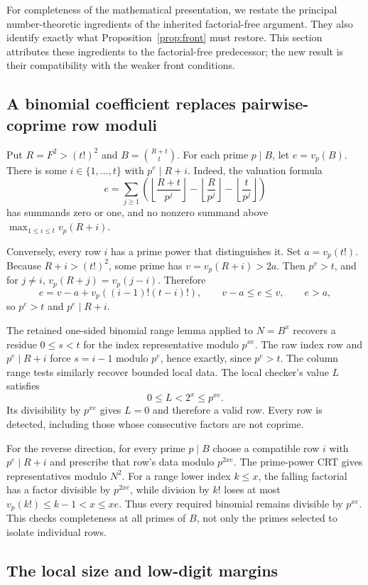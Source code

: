\documentclass[11pt]{article}
\theoremstyle{remark}\newtheorem{remark}[theorem]{Remark}
\begin{document}
For completeness of the mathematical presentation, we restate the
principal number-theoretic ingredients of the inherited factorial-free
argument. They also identify exactly what Proposition~\ref{prop:front}
must restore. This section attributes these ingredients to the
factorial-free predecessor; the new result is their compatibility with
the weaker front conditions.

\subsection{A binomial coefficient replaces pairwise-coprime row moduli}

Put $R=F^2>(t!)^2$ and $B=\binom{R+t}{t}$.
For each prime $p\mid B$, let $e=v_p(B)$.
There is some $i\in\{1,\ldots,t\}$ with $p^e\mid R+i$.
Indeed, the valuation formula
\[
 e=\sum_{j\ge1}\left(
 \left\lfloor\frac{R+t}{p^j}\right\rfloor-
 \left\lfloor\frac R{p^j}\right\rfloor-
 \left\lfloor\frac t{p^j}\right\rfloor\right)
\]
has summands zero or one, and no nonzero summand above
$\max_{1\le i\le t}v_p(R+i)$.

Conversely, every row $i$ has a prime power that distinguishes it.
Set $a=v_p(t!)$. Because $R+i>(t!)^2$, some prime has
$v=v_p(R+i)>2a$. Then $p^v>t$, and for $j\ne i$,
$v_p(R+j)=v_p(j-i)$. Therefore
\[
 e=v-a+v_p((i-1)!(t-i)!),\qquad v-a\le e\le v,
 \qquad e>a,
\]
so $p^e>t$ and $p^e\mid R+i$.

The retained one-sided binomial range lemma applied to
$N=B^x$ recovers a residue $0\le s<t$ for the index representative
modulo $p^{xe}$. The raw index row and $p^e\mid R+i$ force
$s=i-1$ modulo $p^e$, hence exactly, since $p^e>t$.
The column range tests similarly recover bounded local data. The local
checker's value $L$ satisfies
\[
 0\le L<2^x\le p^{xe}.
\]
Its divisibility by $p^{xe}$ gives $L=0$ and therefore a valid row.
Every row is detected, including those whose consecutive factors are
not coprime.

For the reverse direction, for every prime $p\mid B$ choose a compatible
row $i$ with $p^e\mid R+i$ and prescribe that row's data modulo
$p^{2xe}$. The prime-power CRT gives representatives modulo $N^2$.
For a range lower index $k\le x$, the falling factorial has a factor
divisible by $p^{2xe}$, while division by $k!$ loses at most
$v_p(k!)\le k-1<x\le xe$. Thus every required binomial remains
divisible by $p^{xe}$. This checks completeness at all primes of $B$,
not only the primes selected to isolate individual rows.

\subsection{The local size and low-digit margins}
\end{document}
